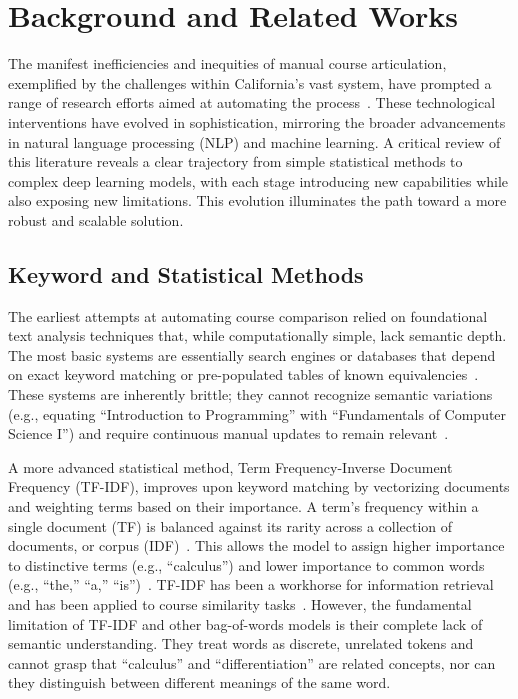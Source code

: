 \chapter{Background and Related Works}

The manifest inefficiencies and inequities of manual course articulation, exemplified by the challenges within California's vast system, have prompted a range of research efforts aimed at automating the process~\cite{ma_course_recommendation_2017, PardosCourse2Vec2019, pardos-articulation-2019, JiangPardosMulti2VecEDM2020,XuPardosSubwordEmbeddings2024}. These technological interventions have evolved in sophistication, mirroring the broader advancements in natural language processing (NLP) and machine learning. A critical review of this literature reveals a clear trajectory from simple statistical methods to complex deep learning models, with each stage introducing new capabilities while also exposing new limitations. This evolution illuminates the path toward a more robust and scalable solution.

\section{Keyword and Statistical Methods}
The earliest attempts at automating course comparison relied on foundational text analysis techniques that, while computationally simple, lack semantic depth. The most basic systems are essentially search engines or databases that depend on exact keyword matching or pre-populated tables of known equivalencies~\cite{shamrock}. These systems are inherently brittle; they cannot recognize semantic variations (e.g., equating ``Introduction to Programming'' with ``Fundamentals of Computer Science I'') and require continuous manual updates to remain relevant~\cite{shiferaw2024}.

A more advanced statistical method, Term Frequency-Inverse Document Frequency (TF-IDF), improves upon keyword matching by vectorizing documents and weighting terms based on their importance. A term's frequency within a single document (TF) is balanced against its rarity across a collection of documents, or corpus (IDF)~\cite{AIZAWA200345}. This allows the model to assign higher importance to distinctive terms (e.g., ``calculus'') and lower importance to common words (e.g., ``the,'' ``a,'' ``is'')~\cite{AIZAWA200345}. TF-IDF has been a workhorse for information retrieval and has been applied to course similarity tasks~\cite{AIZAWA200345}. However, the fundamental limitation of TF-IDF and other bag-of-words models is their complete lack of semantic understanding. They treat words as discrete, unrelated tokens and cannot grasp that ``calculus'' and ``differentiation'' are related concepts, nor can they distinguish between different meanings of the same word.

